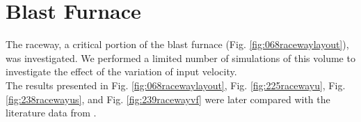 
\chapter{Blast Furnace}
\label{cap:blastfurnace}


The raceway, a critical portion of the blast furnace (Fig.
\ref{fig:068racewaylayout}), was investigated.
We performed a limited number of simulations of this volume to investigate the
effect of the variation of input velocity.\\
The results presented in Fig. \ref{fig:068racewaylayout}, Fig.
\ref{fig:225racewayu}, Fig. \ref{fig:238racewayus}, and Fig.
\ref{fig:239racewayvf} were later compared with the literature data from
\citet{RefWorks:208}.







